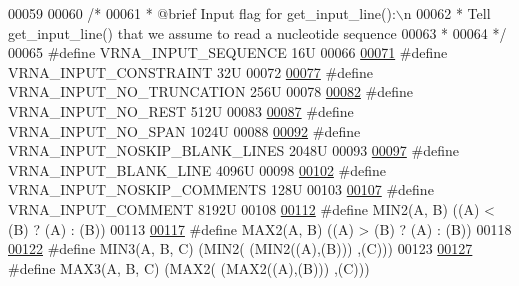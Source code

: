 \begin{DoxyCode}
00059 
00060 \textcolor{comment}{/*}
00061 \textcolor{comment}{ *  @brief  Input flag for get\_input\_line():\(\backslash\)n}
00062 \textcolor{comment}{ *  Tell get\_input\_line() that we assume to read a nucleotide sequence}
00063 \textcolor{comment}{ * }
00064 \textcolor{comment}{ */}
00065 \textcolor{preprocessor}{#define VRNA\_INPUT\_SEQUENCE               16U}
00066 
\hypertarget{utils_8h_source_l00071}{}\hyperlink{group__utils_gac08a9df45b9721b97a47dbfe7a6e5f85}{00071} \textcolor{preprocessor}{#define VRNA\_INPUT\_CONSTRAINT             32U}
00072 
\hypertarget{utils_8h_source_l00077}{}\hyperlink{group__utils_ga086742158293217a46ae2f71bb296937}{00077} \textcolor{preprocessor}{#define VRNA\_INPUT\_NO\_TRUNCATION          256U}
00078 
\hypertarget{utils_8h_source_l00082}{}\hyperlink{group__utils_ga7a2e8c50a0c7ce82e60da1016e1367fd}{00082} \textcolor{preprocessor}{#define VRNA\_INPUT\_NO\_REST                512U}
00083 
\hypertarget{utils_8h_source_l00087}{}\hyperlink{group__utils_ga0de536599b881c787b0943a2671da476}{00087} \textcolor{preprocessor}{#define VRNA\_INPUT\_NO\_SPAN                1024U}
00088 
\hypertarget{utils_8h_source_l00092}{}\hyperlink{group__utils_gab4db885222b3b69608310d7c7e63e286}{00092} \textcolor{preprocessor}{#define VRNA\_INPUT\_NOSKIP\_BLANK\_LINES     2048U}
00093 
\hypertarget{utils_8h_source_l00097}{}\hyperlink{group__utils_ga305474b93ccb79ae4c7754016a8ddd84}{00097} \textcolor{preprocessor}{#define VRNA\_INPUT\_BLANK\_LINE             4096U}
00098 
\hypertarget{utils_8h_source_l00102}{}\hyperlink{group__utils_ga0f6311f11bed1842e3a527ab27b294c6}{00102} \textcolor{preprocessor}{#define VRNA\_INPUT\_NOSKIP\_COMMENTS        128U}
00103 
\hypertarget{utils_8h_source_l00107}{}\hyperlink{group__utils_gaf2062e0eeefffd3ed639af460b3d4fab}{00107} \textcolor{preprocessor}{#define VRNA\_INPUT\_COMMENT                8192U}
00108 
\hypertarget{utils_8h_source_l00112}{}\hyperlink{group__utils_gae0b9cd0ce090bd69b951aa73e8fa4f7d}{00112} \textcolor{preprocessor}{#define MIN2(A, B)      ((A) < (B) ? (A) : (B))}
00113 
\hypertarget{utils_8h_source_l00117}{}\hyperlink{group__utils_ga33297b3679c713b0c4d897cd0fe3b122}{00117} \textcolor{preprocessor}{#define MAX2(A, B)      ((A) > (B) ? (A) : (B))}
00118 
\hypertarget{utils_8h_source_l00122}{}\hyperlink{group__utils_ga721b8d5f3abef17f10293f1f7f8c958e}{00122} \textcolor{preprocessor}{#define MIN3(A, B, C)   (MIN2(  (MIN2((A),(B))) ,(C)))}
00123 
\hypertarget{utils_8h_source_l00127}{}\hyperlink{group__utils_ga8d577123d2e66d2b7d0bf9af6e172b93}{00127} \textcolor{preprocessor}{#define MAX3(A, B, C)   (MAX2(  (MAX2((A),(B))) ,(C)))}

\end{DoxyCode}
